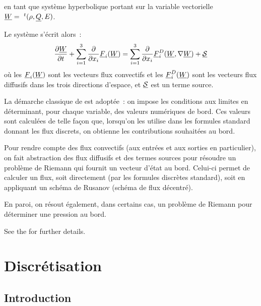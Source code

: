 en tant que système hyperbolique portant sur la variable vectorielle
$\underline{W}=\ ^t(\rho,\underline{Q},E)$.

Le système s'écrit alors~:
\begin{equation}\label{Cfbl_Cfxtcl_eq_hyperbolique_cfxtcl}
\displaystyle\frac{\partial \underline{W}}{\partial t}
+ \displaystyle\sum\limits_{i=1}^3
\frac{\partial}{\partial x_i}\underline{F}_i(\underline{W})
= \displaystyle\sum\limits_{i=1}^3
\frac{\partial}{\partial x_i}\underline{F}_i^D(\underline{W},\nabla \underline{W})
+ \underline{\mathcal{S}}
\end{equation}
où les $\underline{F}_i(\underline{W})$ sont les vecteurs flux convectifs
et les $\underline{F}_i^D(\underline{W})$ sont les vecteurs flux diffusifs
dans les trois directions d'espace,
et $\underline{\mathcal{S}}$ est un terme source.

La démarche classique de \CS est adoptée~: on impose les conditions
aux limites en déterminant, pour chaque variable, des valeurs numériques
de bord. Ces valeurs sont calculées de telle façon que, lorsqu'on
les utilise dans les formules standard donnant les flux discrets, on obtienne
les contributions souhaitées au bord.

Pour rendre compte des flux convectifs (aux entrées et aux sorties en particulier),
on fait abstraction des flux diffusifs et des termes
sources pour résoudre un problème de Riemann qui
fournit un vecteur d'état au bord. Celui-ci permet de calculer un flux,
soit directement (par les formules discrètes standard),
soit en appliquant un schéma de Rusanov (schéma de flux décentré).

En paroi, on résout  également, dans certains cas, un problème de
Riemann pour déterminer une pression au bord.

See the  for further details.

\section*{Discrétisation}

\subsection*{Introduction}

